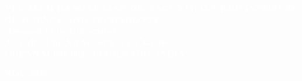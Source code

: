 \documentclass[10pt]{report}
\begin{document}
\begin{center}
\vspace{0.5cm}
\Large{\textbf{\textcolor{white}{VEL TECH RANGARAJAN DR. SAGUNTHALA R\&D INSTITUTE OF SCIENCE AND TECHNOLOGY}}}\\

\Large{\textbf{\textcolor{white}{(Deemed to be University)}}}\\
\Large{\textbf{\textcolor{white}{Accredited by NAAC with A++ Grade}}}\\
\large{\textbf{\textcolor{white}{CHENNAI 600 062, TAMILNADU, INDIA}}}

\vspace{0.4cm}
\large{\textbf{\textcolor{white}{NOV 2026}}}

\end{center}

\newpage
\nopagecolor
\color{black}
\end{document}
